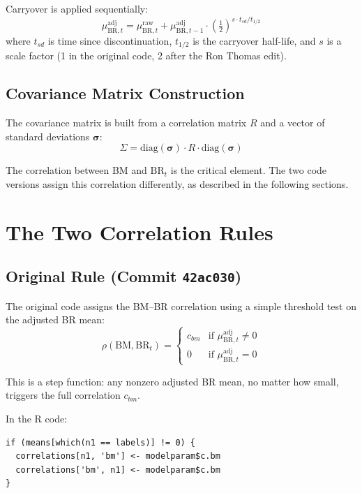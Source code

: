 \documentclass[11pt]{article}
\begin{document}
Carryover is applied sequentially:
\[
\mu_{\text{BR},t}^{\text{adj}} =
  \mu_{\text{BR},t}^{\text{raw}} +
  \mu_{\text{BR},t-1}^{\text{adj}} \cdot
  \left(\tfrac{1}{2}\right)^{s \cdot t_{sd} / t_{1/2}}
\]
where $t_{sd}$ is time since discontinuation, $t_{1/2}$ is
the carryover half-life, and $s$ is a scale factor (1 in the
original code, 2 after the Ron Thomas edit).

\subsection{Covariance Matrix Construction}

The covariance matrix is built from a correlation matrix
$R$ and a vector of standard deviations $\boldsymbol{\sigma}$:
\[
\Sigma = \text{diag}(\boldsymbol{\sigma}) \cdot R \cdot
  \text{diag}(\boldsymbol{\sigma})
\]

The correlation between BM and $\text{BR}_t$ is the critical
element. The two code versions assign this correlation
differently, as described in the following sections.

\section{The Two Correlation Rules}

\subsection{Original Rule (Commit \texttt{42ac030})}

The original code assigns the BM--BR correlation using a
simple threshold test on the adjusted BR mean:
\[
\rho(\text{BM}, \text{BR}_t) =
\begin{cases}
c_{bm} & \text{if } \mu_{\text{BR},t}^{\text{adj}} \neq 0 \\
0 & \text{if } \mu_{\text{BR},t}^{\text{adj}} = 0
\end{cases}
\]

This is a step function: any nonzero adjusted BR mean, no
matter how small, triggers the full correlation $c_{bm}$.

In the R code:
\begin{verbatim}
if (means[which(n1 == labels)] != 0) {
  correlations[n1, 'bm'] <- modelparam$c.bm
  correlations['bm', n1] <- modelparam$c.bm
}
\end{verbatim}
\end{document}
